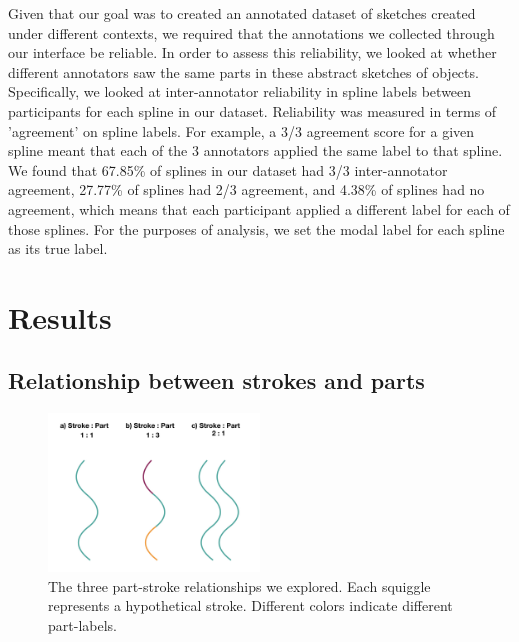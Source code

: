 \documentclass[10pt,letterpaper]{article}
\begin{document}
Given that our goal was to created an annotated dataset of sketches created under different contexts, we required that the annotations we collected through our interface be reliable. In order to assess this reliability, we looked at whether different annotators saw the same parts in these abstract sketches of objects. Specifically, we looked at inter-annotator reliability in spline labels between participants for each spline in our dataset. Reliability was measured in terms of 'agreement' on spline labels. For example, a 3/3 agreement score for a given spline meant that each of the 3 annotators applied the same label to that spline. We found that 67.85\% of splines in our dataset had 3/3 inter-annotator agreement, 27.77\% of splines had 2/3 agreement, and 4.38\% of splines had no agreement, which means that each participant applied a different label for each of those splines.
For the purposes of analysis, we set the modal label for each spline as its true label.

\section{Results}

\subsection{Relationship between strokes and parts}

\begin{figure}[htbp]
\centering
\includegraphics[width=0.5\textwidth]{figures/Part-Stroke.jpeg}
\caption{The three part-stroke relationships we explored. Each squiggle represents a hypothetical stroke. Different colors indicate different part-labels.}
\end{figure}
\end{document}
